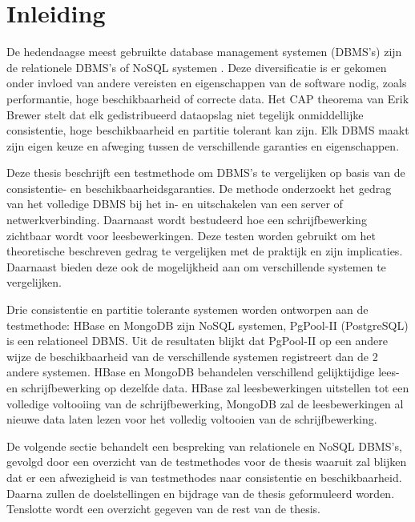 \chapter{Inleiding}
De hedendaagse meest gebruikte database management systemen (DBMS's) zijn de relationele DBMS's of NoSQL systemen \cite{dbengine-ranking}. Deze diversificatie is er gekomen onder invloed van andere vereisten en eigenschappen van de software nodig, zoals performantie, hoge beschikbaarheid of correcte data. 
Het CAP theorema van Erik Brewer\cite{Brewer:2000:TRD:343477.343502} stelt dat elk gedistribueerd dataopslag niet tegelijk onmiddellijke consistentie, hoge beschikbaarheid en partitie tolerant kan zijn. Elk DBMS maakt zijn eigen keuze en afweging tussen de verschillende garanties en eigenschappen.

Deze thesis beschrijft een testmethode om DBMS's te vergelijken op basis van de consistentie- en beschikbaarheidsgaranties. De methode onderzoekt het gedrag van het volledige DBMS bij het in- en uitschakelen van een server of netwerkverbinding. Daarnaast wordt bestudeerd hoe een schrijfbewerking zichtbaar wordt voor leesbewerkingen. Deze testen worden gebruikt om het theoretische beschreven gedrag te vergelijken met de praktijk en zijn implicaties. Daarnaast bieden deze ook de mogelijkheid aan om verschillende systemen te vergelijken. 

Drie consistentie en partitie tolerante systemen worden ontworpen aan de testmethode: HBase en MongoDB zijn NoSQL systemen, PgPool-II (PostgreSQL) is een relationeel DBMS. Uit de resultaten blijkt dat PgPool-II op een andere wijze de beschikbaarheid van de verschillende systemen registreert dan de 2 andere systemen. HBase en MongoDB behandelen verschillend gelijktijdige lees- en schrijfbewerking op dezelfde data. HBase zal leesbewerkingen uitstellen tot een volledige voltooiing van de schrijfbewerking, MongoDB zal de leesbewerkingen al nieuwe data laten lezen voor het volledig voltooien van de schrijfbewerking. 

De volgende sectie behandelt een bespreking van relationele en NoSQL DBMS's, gevolgd door een overzicht van de testmethodes voor de thesis waaruit zal blijken dat er een afwezigheid is van testmethodes naar consistentie en beschikbaarheid. Daarna zullen de doelstellingen en bijdrage van de thesis geformuleerd worden. Tenslotte wordt een overzicht gegeven van de rest van de thesis. 


%
%

